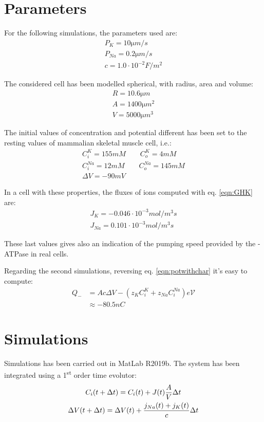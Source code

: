 \documentclass[11pt,a4 paper]{article}
\let\oldfrac\frac
\renewcommand{\frac}[3][d]{\ifthenelse{\equal{#1}{d}}{\oldfrac{#2}{#3}}{\nicefrac{#2}{#3}}}
\begin{document}
\section{Parameters}
For the following simulations, the parameters used are:
\begin{gather*}
    P_{K} = 10 \si{\micro m/s} \\
    P_{Na} = 0.2 \si{\micro m/s} \\
    c = 1.0 \cdot 10^{-2} \si{F / m^2}
\end{gather*}

The considered cell has been modelled spherical, with radius, area and volume:
\begin{align*}
    R = 10.6 \si{\micro m} \\
    A = 1400 \si{\micro m^2} \\
    V = 5000 \si{\micro m^3}
\end{align*}

The initial values of concentration and potential different has been set to the resting values of mammalian skeletal muscle cell, i.e.:
\begin{gather*}
    C_i^K = 155 \si{mM} \qquad C_o^K = 4\si{mM} \\
    C_i^{Na} = 12 \si{mM} \qquad C_o^{Na} = 145\si{mM} \\
    \Delta V = -90 \si{mV}
\end{gather*}

In a cell with these properties, the fluxes of ions computed with eq. \eqref{eqn:GHK} are:
\begin{gather*}
    J_K = -0.046 \cdot 10^{-3} \si{mol / m^3s} \\
    J_{Na} = 0.101 \cdot 10^{-3} \si{mol / m^3s}
\end{gather*}

These last values gives also an indication of the pumping speed provided by the -ATPase in real cells.

\bigskip
Regarding the second simulations, reversing eq. \ref{eqn:potwithchar} it's easy to compute:
\begin{align*}
    Q_- &= Ac\Delta V - (z_KC_i^K + z_{Na}C_i^{Na})e\mathcal{V} \\
    &\approx -80.5 \si{nC}
\end{align*}

\section{Simulations}
Simulations has been carried out in MatLab R2019b. The system has been integrated using a 1\textsuperscript{st} order time evolutor:
\begin{gather*}
    C_i(t+\Delta t) = C_i(t) + J(t) \frac{A}{V} \Delta t \\
    \Delta V(t+\Delta t) = \Delta V(t) + \frac{j_{Na}(t) + j_K(t)}{c} \Delta t
\end{gather*}
\end{document}
